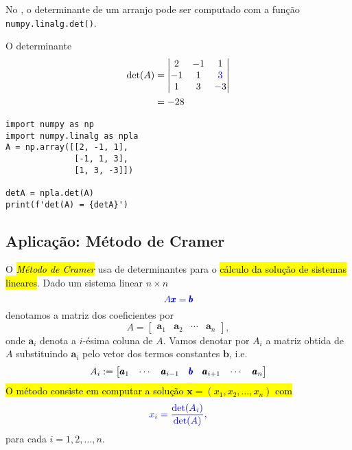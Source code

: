 No {\numpy}, o determinante de um arranjo pode ser computado com a função \lstinline+numpy.linalg.det()+.

\begin{ex}
  O determinante
  \begin{subequations}
    \begin{align}
      \det(A) &=
                \begin{vmatrix}
                  2 & -1 & 1\\
                  -1 & 1 & {\color{blue}3}\\
                  1 & 3 & -3
                \end{vmatrix}\\
              &= -28
    \end{align}
  \end{subequations}

\begin{lstlisting}
import numpy as np
import numpy.linalg as npla
A = np.array([[2, -1, 1],
              [-1, 1, 3],
              [1, 3, -3]])

detA = npla.det(A)
print(f'det(A) = {detA}')
\end{lstlisting}
\end{ex}

\subsection{Aplicação: Método de Cramer}

O \hl{\emph{Método de Cramer}}{\cramer} usa de determinantes para o \hl{cálculo da solução de sistemas lineares}. Dado um sistema linear $n\times n$
\begin{equation}\color{blue}A\pmb{x} = \pmb{b}
\end{equation}
denotamos a matriz dos coeficientes por
\begin{equation}
  A =
  \begin{bmatrix}
    \pmb{a}_1 & \pmb{a}_2 & \cdots & \pmb{a}_n
\end{bmatrix},
\end{equation}
onde $\pmb{a}_i$ denota a $i$-ésima coluna de $A$. Vamos denotar por $A_i$ a matriz obtida de $A$ substituindo $\pmb{a}_i$ pelo vetor dos termos constantes $\pmb{b}$, i.e.
\begin{equation}
  A_i :=
  \begin{bmatrix}
    \pmb{a}_1 & \cdots & \pmb{a}_{i-1} & {\color{blue}\pmb{b}} & \pmb{a}_{i+1} & \cdots & \pmb{a}_n
  \end{bmatrix}
\end{equation}
\hl{O método consiste em computar a solução $\pmb{x} = (x_1, x_2, \ldots, x_n)$ com}
\begin{equation}\color{blue}x_i = \frac{\det(A_i)}{\det(A)},
\end{equation}
para cada $i = 1, 2, \dotsc, n$.

